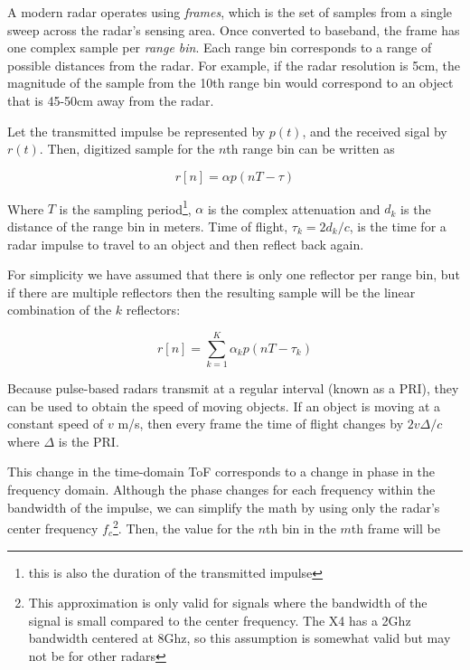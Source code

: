 \documentclass[12pt]{article}
\begin{document}

A modern radar operates using \emph{frames}, which is the set of
samples from a single sweep across the radar's sensing area. Once
converted to baseband, the frame has one complex sample per
\emph{range bin}. Each range bin corresponds to a range of possible
distances from the radar. For example, if the radar resolution is 5cm,
the magnitude of the sample from the 10th range bin would correspond
to an object that is 45-50cm away from the radar.

Let the transmitted impulse be represented by $p(t)$, and the received
sigal by $r(t)$. Then, digitized sample for the $n$th range bin can be
written as

\begin{equation}
r[n] = \alpha p(nT - \tau)  
\end{equation}

Where $T$ is the sampling period\footnote{this is also the duration of
  the transmitted impulse}, $\alpha$ is the complex attenuation and
$d_k$ is the distance of the range bin in meters. Time of flight,
$\tau_k = 2d_k/c$, is the time for a radar impulse to travel to an object and
then reflect back again. 

For simplicity we have assumed that there is only one reflector per
range bin, but if there are multiple reflectors then the resulting
sample will be the linear combination of the $k$ reflectors:

\begin{equation}
r[n] = \sum\limits_{k=1}^K \alpha_k p(nT - \tau_k)  
\end{equation}

Because pulse-based radars transmit at a regular interval (known as a
PRI), they can be used to obtain the speed of moving objects. If an
object is moving at a constant speed of $v$ m/s, then every frame the
time of flight changes by $2v\Delta/c$ where $\Delta$ is the PRI.

This change in the time-domain ToF corresponds to a change in phase in
the frequency domain. Although the phase changes for each frequency
within the bandwidth of the impulse, we can simplify the math by using
only the radar's center frequency $f_c$\footnote{This approximation is
  only valid for signals where the bandwidth of the signal is small
  compared to the center frequency. The X4 has a 2Ghz bandwidth
  centered at 8Ghz, so this assumption is somewhat valid but may not
  be for other radars}. Then, the value for the $n$th bin in the $m$th
frame will be
\end{document}
